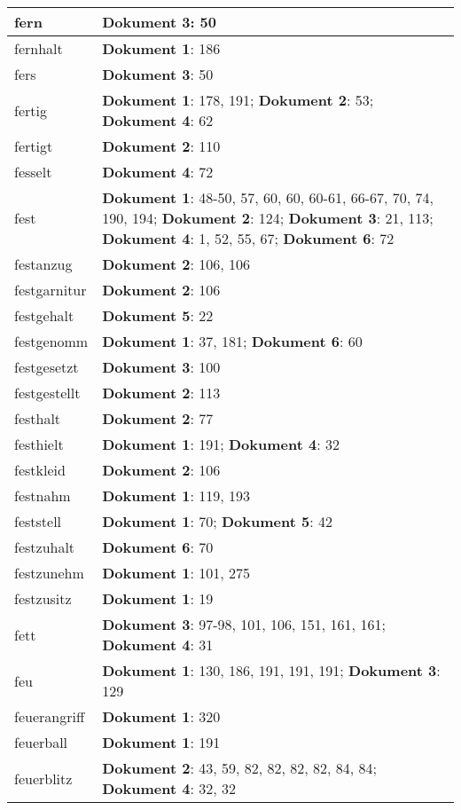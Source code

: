 \documentclass[a5paper]{article}
\begin{document}
\begin{longtable}[l]{|l|p{3in}|}
\hline
fern & \textbf{Dokument 3}: 50 \\
\hline
fernhalt & \textbf{Dokument 1}: 186 \\
\hline
fers & \textbf{Dokument 3}: 50 \\
\hline
fertig & \textbf{Dokument 1}: 178, 191; \textbf{Dokument 2}: 53; \textbf{Dokument 4}: 62 \\
\hline
fertigt & \textbf{Dokument 2}: 110 \\
\hline
fesselt & \textbf{Dokument 4}: 72 \\
\hline
fest & \textbf{Dokument 1}: 48-50, 57, 60, 60, 60-61, 66-67, 70, 74, 190, 194; \textbf{Dokument 2}: 124; \textbf{Dokument 3}: 21, 113; \textbf{Dokument 4}: 1, 52, 55, 67; \textbf{Dokument 6}: 72 \\
\hline
festanzug & \textbf{Dokument 2}: 106, 106 \\
\hline
festgarnitur & \textbf{Dokument 2}: 106 \\
\hline
festgehalt & \textbf{Dokument 5}: 22 \\
\hline
festgenomm & \textbf{Dokument 1}: 37, 181; \textbf{Dokument 6}: 60 \\
\hline
festgesetzt & \textbf{Dokument 3}: 100 \\
\hline
festgestellt & \textbf{Dokument 2}: 113 \\
\hline
festhalt & \textbf{Dokument 2}: 77 \\
\hline
festhielt & \textbf{Dokument 1}: 191; \textbf{Dokument 4}: 32 \\
\hline
festkleid & \textbf{Dokument 2}: 106 \\
\hline
festnahm & \textbf{Dokument 1}: 119, 193 \\
\hline
feststell & \textbf{Dokument 1}: 70; \textbf{Dokument 5}: 42 \\
\hline
festzuhalt & \textbf{Dokument 6}: 70 \\
\hline
festzunehm & \textbf{Dokument 1}: 101, 275 \\
\hline
festzusitz & \textbf{Dokument 1}: 19 \\
\hline
fett & \textbf{Dokument 3}: 97-98, 101, 106, 151, 161, 161; \textbf{Dokument 4}: 31 \\
\hline
feu & \textbf{Dokument 1}: 130, 186, 191, 191, 191; \textbf{Dokument 3}: 129 \\
\hline
feuerangriff & \textbf{Dokument 1}: 320 \\
\hline
feuerball & \textbf{Dokument 1}: 191 \\
\hline
feuerblitz & \textbf{Dokument 2}: 43, 59, 82, 82, 82, 82, 84, 84; \textbf{Dokument 4}: 32, 32 \\

\end{longtable}
\end{document}
